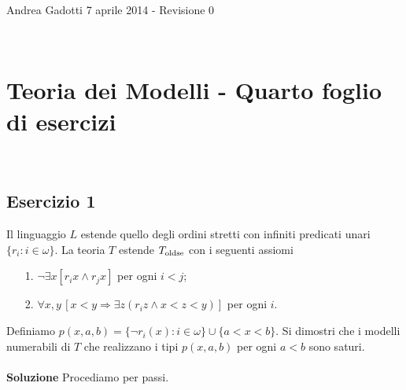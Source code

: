 \documentclass[10pt,a4paper]{article}
\def\E{\exists}
\def\A{\forall}
\begin{document}
\noindent Andrea Gadotti \hfill 7 aprile 2014 - Revisione 0 

\

\section*{Teoria dei Modelli - Quarto foglio di esercizi}

\

\subsection*{Esercizio 1}
Il linguaggio $L$ estende quello degli ordini stretti con infiniti predicati unari $\{r_i:i\in\omega\}$. La teoria $T$ estende $T_{\rm oldse}$ con i seguenti assiomi
\begin{itemize}
\item[1.] $\neg\E x [r_ix\wedge r_jx]$ per ogni $i<j$;
\item[2.] $\A x,y\,[x<y \Rightarrow \E z (r_iz\wedge x<z<y)]$ per ogni $i$.
\end{itemize}
Definiamo $p(x,a,b)=\{\neg r_i(x) : i\in\omega\}\cup\{a<x<b\}$. Si dimostri che i modelli numerabili di $T$ che realizzano i tipi $p(x,a,b)$ per ogni $a<b$ sono saturi.\\
\\
\noindent\textbf{Soluzione} 
Procediamo per passi.
\end{document}

